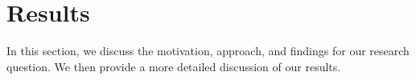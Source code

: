 \documentclass{sig-alternate-05-2015}
\newcommand{\dan}[1]{\textcolor{blue}{{\it [Dan says: #1]}}}
\begin{document}
\section{Results}
\label{sec:Results}

In this section, we discuss the motivation, approach, and findings for our research question. We then provide a more detailed discussion of our results. %



\end{document}
